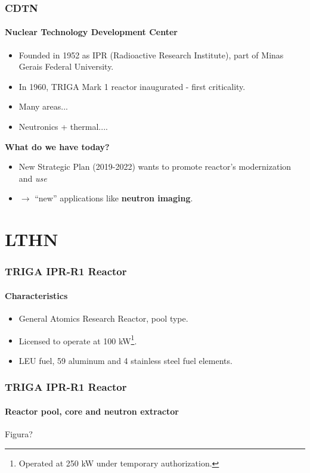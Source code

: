 \documentclass[svgnames,smaller,table]{beamer}
\begin{document}
\begin{frame}
  \frametitle{CDTN}
  \framesubtitle{Nuclear Technology Development Center}
  \begin{itemize}
  \item Founded in 1952 as IPR (Radioactive Research Institute), part of
    Minas Gerais Federal University.
  \item In 1960, TRIGA Mark 1 reactor inaugurated - first criticality.
  \item Many areas...
    \item Neutronics + thermal....
      \end{itemize}
  \textbf{What do we have today?}
  \begin{itemize}
  \item New Strategic Plan (2019-2022) wants to promote reactor's modernization and \textit{use}
    \pause
    \item $\rightarrow$ ``new'' applications like \textbf{neutron imaging}. 
  \end{itemize}
\end{frame}


\section{LTHN}
\begin{frame}
  \frametitle{TRIGA IPR-R1 Reactor}
  \framesubtitle{Characteristics}
  \begin{center}
    \begin{itemize}
    \item General Atomics Research Reactor, pool type.
    \item Licensed to operate at 100 kW\footnote{Operated at 250 kW under temporary authorization.}.
    \item LEU fuel, 59 aluminum and 4 stainless steel fuel elements.
    \end{itemize}
  \end{center}
\end{frame}

\begin{frame}
  \frametitle{TRIGA IPR-R1 Reactor}
  \framesubtitle{Reactor pool, core and neutron extractor}
  \begin{center}
    Figura?
  \end{center}
\end{frame}
\end{document}
